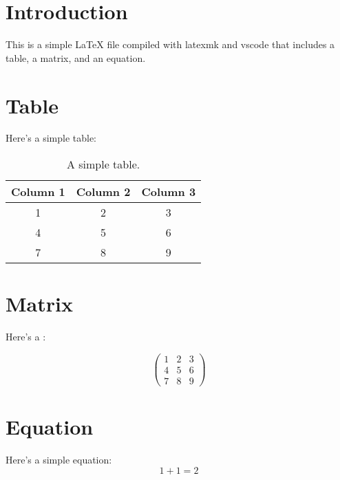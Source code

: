 \documentclass{article}
\begin{document}
\section{Introduction}

This is a simple LaTeX file compiled with latexmk and vscode
that includes a table, a matrix, and an equation.


\section{Table}

Here's a simple table:

\begin{table}[h]
  \centering
  \begin{tabular}{ccc}
    \toprule
    Column 1 & Column 2 & Column 3 \\
    \midrule
    1        & 2        & 3        \\
    4        & 5        & 6        \\
    7        & 8        & 9        \\
    \bottomrule
  \end{tabular}
  \caption{A simple table.}\label{tab:simple-table}
\end{table}
\section{Matrix}

Here's a :

\begin{equation}
  \begin{pmatrix}
    1 & 2 & 3 \\
    4 & 5 & 6 \\
    7 & 8 & 9
  \end{pmatrix}
\end{equation}

\section{Equation}

Here's a simple equation:
\[
  1 + 1 = 2
\]
\end{document}
